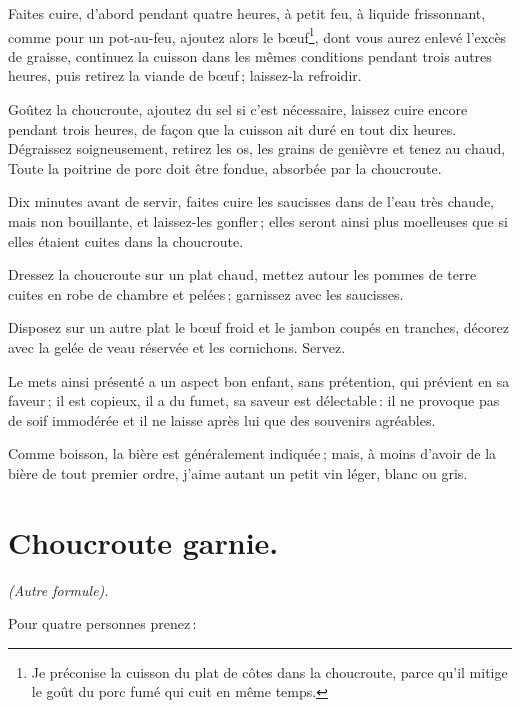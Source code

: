 Faites cuire, d'abord pendant quatre heures, à petit feu, à liquide
frissonnant, comme pour un pot-au-feu, ajoutez alors le bœuf\footnote{Je
préconise la cuisson du plat de côtes dans la choucroute, parce qu'il mitige le
goût du porc fumé qui cuit en même temps.}, dont vous aurez enlevé l'excès de
graisse, continuez la cuisson dans les mêmes conditions pendant trois autres
heures, puis retirez la viande de bœuf ; laissez-la refroidir.

Goûtez la choucroute, ajoutez du sel si c'est nécessaire, laissez cuire encore
pendant trois heures, de façon que la cuisson ait duré en tout dix heures.
Dégraissez soigneusement, retirez les os, les grains de genièvre et tenez au chaud,
Toute la poitrine de porc doit être fondue, absorbée par la choucroute.

Dix minutes avant de servir, faites cuire les saucisses dans de l'eau très
chaude, mais non bouillante, et laissez-les gonfler ; elles seront ainsi plus
moelleuses que si elles étaient cuites dans la choucroute.

Dressez la choucroute sur un plat chaud, mettez autour les pommes de terre
cuites en robe de chambre et pelées ; garnissez avec les saucisses.

Disposez sur un autre plat le bœuf froid et le jambon coupés en tranches,
décorez avec la gelée de veau réservée et les cornichons. Servez.

Le mets ainsi présenté a un aspect bon enfant, sans prétention, qui prévient en
sa faveur ; il est copieux, il a du fumet, sa saveur est délectable : il ne
provoque pas de soif immodérée et il ne laisse après lui que des souvenirs
agréables.

Comme boisson, la bière est généralement indiquée ; mais, à moins d’avoir de la
bière de tout premier ordre, j'aime autant un petit vin léger, blanc ou gris.

\section*{\centering Choucroute garnie.}
{}

\begin{center}
\textit{(Autre formule).}
\end{center}

Pour quatre personnes prenez :

